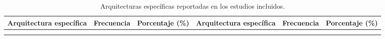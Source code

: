 \begingroup

\setlength{\tabcolsep}{3pt}
\renewcommand{\arraystretch}{1.05}
\scriptsize

\begin{xltabular}{\textwidth}{
    >{\raggedright\arraybackslash}X
    >{\centering\arraybackslash}p{1.5cm}
    >{\centering\arraybackslash}p{1.8cm}
    >{\raggedright\arraybackslash}X
    >{\centering\arraybackslash}p{1.5cm}
    >{\centering\arraybackslash}p{1.8cm}
}
\caption{Arquitecturas específicas reportadas en los estudios incluidos.}
\label{tab:rq1-arquitecturas-especificas} \\

\hline
\textbf{Arquitectura específica} &
\textbf{Frecuencia} &
\textbf{Porcentaje (\%)} &
\textbf{Arquitectura específica} &
\textbf{Frecuencia} &
\textbf{Porcentaje (\%)} \\
\hline
\endfirsthead

\endhead

\hline
\endfoot

\hline
{} \\
\endlastfoot


\end{xltabular}
